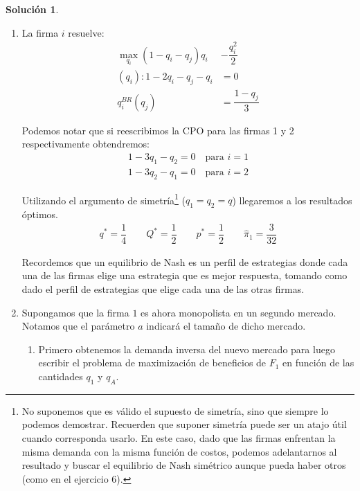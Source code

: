 \documentclass[a4paper, 11pt]{article}
\theoremstyle{definition}
\newtheorem{solucion}{Soluci\'on}
\begin{document}
\begin{solucion} %
\

 \begin{enumerate}[label=(\alph*)]
 
 \item
 La firma $i$ resuelve:
 \vspace*{-12pt}
 \begin{align*}
 \displaystyle\max_{q_i} (1-q_i-q_j)q_i &- \dfrac{q_i^2}{2} \\
 (q_i): 1-2q_i-q_j-q_i &=0\\
 q_i^{BR}(q_j) &=\dfrac{1-q_j}{3}
 \end{align*}
 
Podemos notar que si reescribimos la CPO para las firmas 1 y 2 respectivamente obtendremos:
 \vspace*{-12pt}
 \begin{align*}
     1-3q_1-q_2=0 \quad \text{para }i=1\\
    1-3q_2-q_1=0 \quad \text{para }i=2
 \end{align*}
 
Utilizando el argumento de simetría\footnote{No suponemos que es válido el supuesto de simetría, sino que siempre lo podemos demostrar. Recuerden que suponer simetría puede ser un atajo útil cuando corresponda usarlo. En este caso, dado que las firmas enfrentan la misma demanda con la misma función de costos, podemos adelantarnos al resultado y buscar el equilibrio de Nash simétrico aunque pueda haber otros (como en el ejercicio 6).} ($q_1=q_2=q$) llegaremos a los resultados óptimos.
 \begin{align*}
 q^*=\dfrac{1}{4} \qquad
 Q^*=\dfrac{1}{2} \qquad
 p^*=\dfrac{1}{2} \qquad \hat{\pi}_1=\dfrac{3}{32}
  \end{align*}
  
  Recordemos que un equilibrio de Nash es un perfil de estrategias donde cada una de las firmas elige una estrategia que es mejor respuesta, tomando como dado el perfil de estrategias que elige cada una de las otras firmas.

 \item
Supongamos que la firma $1$ es ahora monopolista en un segundo mercado. Notamos que el parámetro $a$ indicará el tamaño de dicho mercado.
 
\begin{enumerate}[label=\roman*.]
 \item
 Primero obtenemos la demanda inversa del nuevo mercado para luego escribir el problema de maximización de beneficios de $F_1$ en función de las cantidades $q_1$ y $q_A$.
 

\end{enumerate}
\end{enumerate}
\end{solucion}
\end{document}
